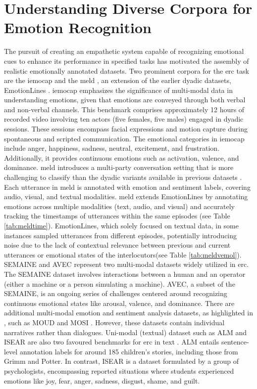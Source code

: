 \section[Understanding Diverse Corpora for Emotion Recognition]{Understanding Diverse Corpora for Emotion \newline Recognition}

The pursuit of creating an empathetic system capable of recognizing emotional cues to enhance its performance in specified tasks has motivated the assembly of realistic emotionally annotated datasets. Two prominent corpora for the \ac{erc} task are the \ac{iemocap} \cite{iemocap} and the \ac{meld} \cite{meld}, an extension of the earlier dyadic datasets, EmotionLines \cite{emotionlines}. \ac{iemocap} emphasizes the significance of multi-modal data in understanding emotions, given that emotions are conveyed through both verbal and non-verbal channels. This benchmark comprises approximately 12 hours of recorded video involving ten actors (five females, five males) engaged in dyadic sessions. These sessions encompass facial expressions and motion capture during spontaneous and scripted communication. The emotional categories in \ac{iemocap} include anger, happiness, sadness, neutral, excitement, and frustration. Additionally, it provides continuous emotions such as activation, valence, and dominance. \ac{meld} introduces a multi-party conversation setting that is more challenging to classify than the dyadic variants available in previous datasets \cite{iemocap, emotionlines, semaine}. Each utterance in \ac{meld} is annotated with emotion and sentiment labels, covering audio, visual, and textual modalities. \ac{meld} extends EmotionLines by annotating emotions across multiple modalities (text, audio, and visual) and accurately tracking the timestamps of utterances within the same episodes (see Table \ref{tab:meldtime}). EmotionLines, which solely focused on textual data, in some instances sampled utterances from different episodes, potentially introducing noise due to the lack of contextual relevance between previous and current utterances or emotional states of the interlocutors(see Table \ref{tab:meldvemol}). SEMAINE \cite{semaine} and AVEC \cite{avec2012} represent two multi-modal datasets widely utilized in \ac{erc}. The SEMAINE dataset involves interactions between a human and an operator (either a machine or a person simulating a machine). AVEC, a subset of the SEMAINE, is an ongoing series of challenges centered around recognizing continuous emotional states like arousal, valence, and dominance. There are additional multi-modal emotion and sentiment analysis datasets, as highlighted in \cite{meld}, such as MOUD \cite{moud} and MOSI \cite{mosi}. However, these datasets contain individual narratives rather than dialogues. Uni-modal (textual) dataset such as ALM \cite{alm} and ISEAR \cite{isear} are also two favoured benchmarks for \ac{erc} in text \cite{ercontextsota}. ALM entails sentence-level annotation labels for around 185 children's stories, including those from Grimm and Potter. In contrast, ISEAR is a dataset formulated by a group of psychologists, encompassing reported situations where students experienced emotions like joy, fear, anger, sadness, disgust, shame, and guilt.

